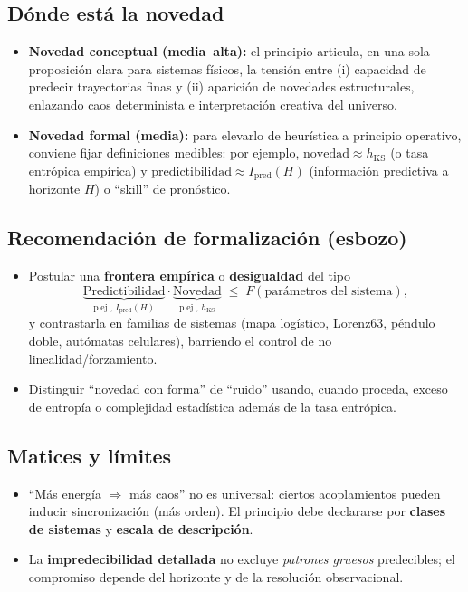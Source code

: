 \documentclass[
  10pt,
  a4paper,
  DIV=11,
  numbers=noendperiod,
  open=any]{scrreprt}
\numberwithin{equation}{chapter}
\numberwithin{equation}{section}
\renewcommand{\[}{\begin{equation}}
\renewcommand{\]}{\end{equation}}
\begin{document}
\subsection{Dónde está la novedad}
\begin{itemize}
  \item \textbf{Novedad conceptual (media–alta):} el principio articula, en una sola proposición clara para sistemas físicos, la tensión entre (i) capacidad de predecir trayectorias finas y (ii) aparición de novedades estructurales, enlazando caos determinista e interpretación creativa del universo. 
  \item \textbf{Novedad formal (media):} para elevarlo de heurística a principio operativo, conviene fijar definiciones medibles: por ejemplo, \(\text{novedad} \approx h_{\mathrm{KS}}\) (o tasa entrópica empírica) y \(\text{predictibilidad} \approx I_{\mathrm{pred}}(H)\) (información predictiva a horizonte \(H\)) o “skill” de pronóstico.
\end{itemize}

\subsection{Recomendación de formalización (esbozo)}
\begin{itemize}
  \item Postular una \textbf{frontera empírica} o \textbf{desigualdad} del tipo
  \[
  \underbrace{\mathrm{Predictibilidad}}_{\text{p.ej., }I_{\mathrm{pred}}(H)}
  \cdot
  \underbrace{\mathrm{Novedad}}_{\text{p.ej., }h_{\mathrm{KS}}}
  \;\le\; F(\text{parámetros del sistema}),
  \]
  y contrastarla en familias de sistemas (mapa logístico, Lorenz63, péndulo doble, autómatas celulares), barriendo el control de no linealidad/forzamiento.
  \item Distinguir “novedad con forma” de “ruido” usando, cuando proceda, exceso de entropía o complejidad estadística además de la tasa entrópica.
\end{itemize}

\subsection{Matices y límites}
\begin{itemize}
  \item “Más energía \(\Rightarrow\) más caos” no es universal: ciertos acoplamientos pueden inducir sincronización (más orden). El principio debe declararse por \textbf{clases de sistemas} y \textbf{escala de descripción}.
  \item La \textbf{impredecibilidad detallada} no excluye \emph{patrones gruesos} predecibles; el compromiso depende del horizonte y de la resolución observacional.
\end{itemize}
\end{document}
